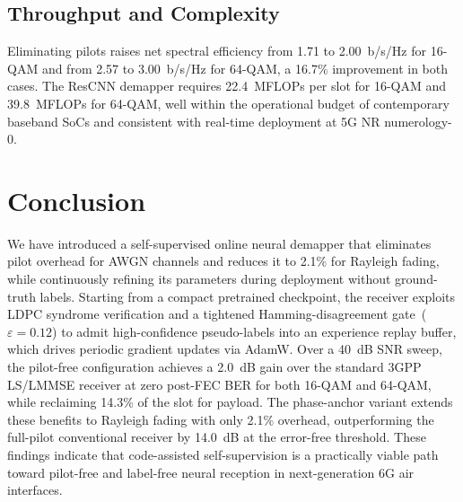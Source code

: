 \documentclass{ieeeaccess}
\begin{document}
\subsection{Throughput and Complexity}

Eliminating pilots raises net spectral efficiency from 1.71 to 2.00~b/s/Hz for
16-QAM and from 2.57 to 3.00~b/s/Hz for 64-QAM, a 16.7\% improvement in both
cases. The ResCNN demapper requires 22.4~MFLOPs per slot for 16-QAM and
39.8~MFLOPs for 64-QAM, well within the operational budget of contemporary
baseband SoCs and consistent with real-time deployment at 5G NR numerology-0.

\section{Conclusion}\label{sec:conclusion}

We have introduced a self-supervised online neural demapper that eliminates
pilot overhead for AWGN channels and reduces it to 2.1\% for Rayleigh fading,
while continuously refining its parameters during deployment without
ground-truth labels. Starting from a compact pretrained checkpoint, the receiver
exploits LDPC syndrome verification and a tightened Hamming-disagreement
gate~($\varepsilon=0.12$) to admit high-confidence pseudo-labels into an
experience replay buffer, which drives periodic gradient updates via AdamW.
Over a 40~dB SNR sweep, the pilot-free configuration achieves a 2.0~dB gain
over the standard 3GPP LS/LMMSE receiver at zero post-FEC BER for both 16-QAM
and 64-QAM, while reclaiming 14.3\% of the slot for payload. The phase-anchor
variant extends these benefits to Rayleigh fading with only 2.1\% overhead,
outperforming the full-pilot conventional receiver by 14.0~dB at the error-free
threshold. These findings indicate that code-assisted self-supervision is a
practically viable path toward pilot-free and label-free neural reception in
next-generation 6G air interfaces.
\end{document}
